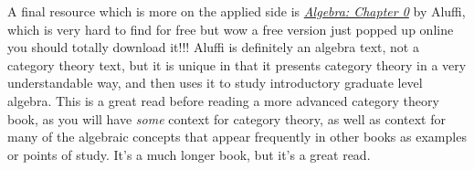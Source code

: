 \documentclass[11pt, letterpaper]{article}
\begin{document}
A final resource which is more on the applied side is \href{https://agorism.dev/book/math/alg/algebra_chapter-0_paolo-aluffi.pdf}{\emph{Algebra: Chapter 0}} by Aluffi, which is very hard to find for free but wow a free version just popped up online you should totally download it!!! Aluffi is definitely an algebra text, not a category theory text, but it is unique in that it presents category theory in a very understandable way, and then uses it to study introductory graduate level algebra. This is a great read before reading a more advanced category theory book, as you will have \emph{some} context for category theory, as well as context for many of the algebraic concepts that appear frequently in other books as examples or points of study. It's a much longer book, but it's a great read.
\end{document}
